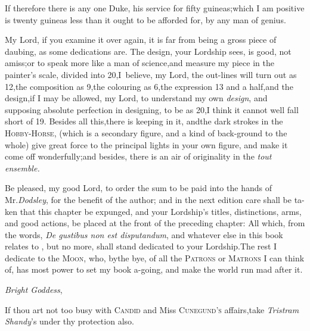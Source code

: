 \documentclass{article}
\begin{document}
If therefore there is any one Duke, 
his service for fifty guineas;\tsh  which\pb
I am positive is twenty guineas less
than it ought to be afforded for, by any man of genius.

My Lord, if you examine it over\break 
again, it is far from being a gross piece\break
of daubing, as some dedications are.\break
The design, your
Lordship sees, is good, 
not amiss;\tsk  or to speak more like a man of
science,\tsk  and measure my piece in the painter’s scale,
divided into 20,\tsk  I~believe, my Lord, the out-lines will turn
out as 12,\tsk  the composition as 9,\tsk  the colouring as
6,\tsk  the expression 13 and a half,\tsk  and the
design,\tsk  if I may be allowed, my Lord, to understand my own
\textit{design}, and supposing absolute perfection in designing, to
be as 20,\tsk  I think it cannot well fall short of 19. Besides
all this,\tsk  there is keeping in it, and\pb the dark strokes in the
\textsc{Hobby-Horse}, (which is a secondary
figure, and a kind of back-ground to the whole) give great force to the
principal lights in your own figure, and make it come off
wonderfully;\tsk  and besides, there is an air of originality in
the \textit{tout ensemble.}

Be pleased, my good Lord, to order the sum to be paid into the
hands of Mr.\break\textit{Dodsley}, for the benefit of the author; and in
the next edition care shall be ta-\break ken that this chapter be expunged,
and your Lordship’s titles, distinctions, arms, and good
actions, be placed at the front of the preceding chapter: All
which, from the words, \textit{De gustibus non est disputandum}, and
whatever else in this book relates to
, but no more, shall
stand dedicated to your Lordship.\tsk\break  The rest I dedicate to the
\textsc{Moon}, who, by\pb the bye, of all the \textsc{Patrons} or
\textsc{Matrons} I can think of, has most power to set my
book a-going, and make the world run mad after it.

\vskip-6pt

\textit{Bright Goddess},

\vskip-6pt

If thou art not too busy with \textsc{Candid} and Miss
\textsc{Cunegund’s} affairs,\tsk  take \textit{Tristram
Shandy}’s under thy protection also.
\end{document}
